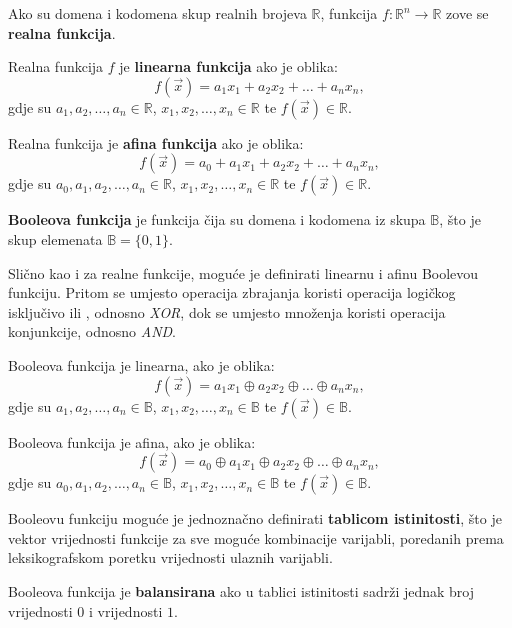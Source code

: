 Ako su domena i kodomena skup realnih brojeva $\mathds{R}$, funkcija $f : \mathds{R}^n \rightarrow \mathds{R}$ zove se \textbf{realna funkcija}.

Realna funkcija $f$ je \textbf{linearna funkcija} ako je oblika:
\begin{equation}
    f(\vec{x}) = a_1x_1 + a_2x_2 + \dots + a_nx_n,
\end{equation}
gdje su $a_1, a_2, \dots, a_n \in \mathds{R}$, $x_1, x_2, \dots, x_n \in \mathds{R}$ te $f(\vec{x}) \in \mathds{R}$.

Realna funkcija je \textbf{afina funkcija} ako je oblika:
\begin{equation}
    f(\vec{x}) = a_0 + a_1x_1 + a_2x_2 + \dots + a_nx_n,
\end{equation}
gdje su $a_0, a_1, a_2, \dots, a_n \in \mathds{R}$, $x_1, x_2, \dots, x_n \in \mathds{R}$ te $f(\vec{x}) \in \mathds{R}$.

\textbf{Booleova funkcija} je funkcija čija su domena i kodomena iz skupa $\mathds{B}$, što je skup elemenata $\mathds{B} = \{0, 1\}$.

Slično kao i za realne funkcije, moguće je definirati linearnu i afinu Boolevou funkciju.
Pritom se umjesto operacija zbrajanja koristi operacija logičkog isključivo ili , odnosno \textit{XOR}, dok se umjesto množenja koristi operacija konjunkcije, odnosno \textit{AND}.

Booleova funkcija je linearna, ako je oblika:
\begin{equation}
    f(\vec{x}) = a_1x_1 \oplus a_2x_2 \oplus \dots \oplus a_nx_n,
\end{equation}
gdje su $a_1, a_2, \dots, a_n \in \mathds{B}$, $x_1, x_2, \dots, x_n \in \mathds{B}$ te $f(\vec{x}) \in \mathds{B}$.

Booleova funkcija je afina, ako je oblika:
\begin{equation}
    f(\vec{x}) = a_0 \oplus a_1x_1 \oplus a_2x_2 \oplus \dots \oplus a_nx_n,
\end{equation}
gdje su $a_0, a_1, a_2, \dots, a_n \in \mathds{B}$, $x_1, x_2, \dots, x_n \in \mathds{B}$ te $f(\vec{x}) \in \mathds{B}$.

Booleovu funkciju moguće je jednoznačno definirati \textbf{tablicom istinitosti}, što je vektor vrijednosti funkcije za sve moguće kombinacije varijabli, poredanih prema leksikografskom poretku vrijednosti ulaznih varijabli.

Booleova funkcija je \textbf{balansirana} ako u tablici istinitosti sadrži jednak broj vrijednosti $0$ i vrijednosti $1$.

